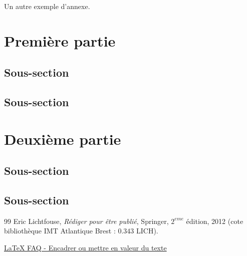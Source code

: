\documentclass[11pt,a4paper,french]{article}
\begin{document}
\begin{IMTAannexes}
\label{sec:S_ANN_EX2}

Un autre exemple d'annexe.
\section{Première partie}


\subsection{Sous-section}
\subsection{Sous-section}

\section{Deuxième partie}

\subsection{Sous-section}
\subsection{Sous-section}

\end{IMTAannexes}

\newpage
{}

\begin{thebibliography}{99}
\bibitem{[Lichtfouse2012]} Eric Lichtfouse, \emph{Rédiger pour être publié}, Springer, $2^{eme}$ édition, 2012
 (cote bibliothèque IMT Atlantique Brest : $0.343$ LICH).
 
 \href{https://www.latex-fr.net/3_composition/texte/paragraphes/encadrer_du_texte}{LaTeX FAQ - Encadrer ou mettre en valeur du texte}
 
\end{thebibliography}
\IMTAcoverpage
\end{document}
